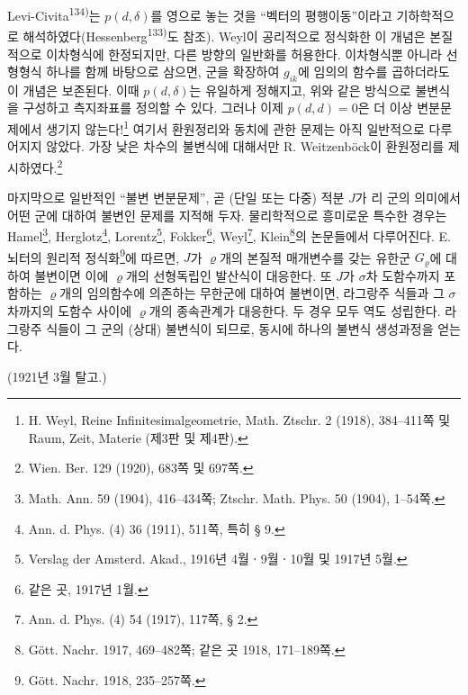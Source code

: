 Levi-Civita\textsuperscript{134)}는 $p(d,\delta)$를 영으로 놓는 것을 ``벡터의 평행이동''이라고 기하학적으로 해석하였다(Hessenberg\textsuperscript{133)}도 참조). Weyl이 공리적으로 정식화한 이 개념은 본질적으로 이차형식에 한정되지만, 다른 방향의 일반화를 허용한다. 이차형식뿐 아니라 선형형식 하나를 함께 바탕으로 삼으면, 군을 확장하여 $g_{ik}$에 임의의 함수를 곱하더라도 이 개념은 보존된다. 이때 $p(d,\delta)$는 유일하게 정해지고, 위와 같은 방식으로 불변식을 구성하고 측지좌표를 정의할 수 있다. 그러나 이제 $p(d,d)=0$은 더 이상 변분문제에서 생기지 않는다!\footnote{H. Weyl, Reine Infinitesimalgeometrie, Math. Ztschr. 2 (1918), 384--411쪽 및 Raum, Zeit, Materie (제3판 및 제4판).} 여기서 환원정리와 동치에 관한 문제는 아직 일반적으로 다루어지지 않았다. 가장 낮은 차수의 불변식에 대해서만 R. Weitzenböck이 환원정리를 제시하였다.\footnote{Wien. Ber. 129 (1920), 683쪽 및 697쪽.}

마지막으로 일반적인 ``불변 변분문제'', 곧 (단일 또는 다중) 적분 $J$가 리 군의 의미에서 어떤 군에 대하여 불변인 문제를 지적해 두자. 물리학적으로 흥미로운 특수한 경우는 Hamel\footnote{Math. Ann. 59 (1904), 416--434쪽; Ztschr. Math. Phys. 50 (1904), 1--54쪽.}, Herglotz\footnote{Ann. d. Phys. (4) 36 (1911), 511쪽, 특히 § 9.}, Lorentz\footnote{Verslag der Amsterd. Akad., 1916년 4월ㆍ9월ㆍ10월 및 1917년 5월.}, Fokker\footnote{같은 곳, 1917년 1월.}, Weyl\footnote{Ann. d. Phys. (4) 54 (1917), 117쪽, § 2.}, Klein\footnote{Gött. Nachr. 1917, 469--482쪽; 같은 곳 1918, 171--189쪽.}의 논문들에서 다루어진다. E. 뇌터의 원리적 정식화\footnote{Gött. Nachr. 1918, 235--257쪽.}에 따르면, $J$가 $\varrho$개의 본질적 매개변수를 갖는 유한군 $G_\varrho$에 대하여 불변이면 이에 $\varrho$개의 선형독립인 발산식이 대응한다. 또 $J$가 $\sigma$차 도함수까지 포함하는 $\varrho$개의 임의함수에 의존하는 무한군에 대하여 불변이면, 라그랑주 식들과 그 $\sigma$차까지의 도함수 사이에 $\varrho$개의 종속관계가 대응한다. 두 경우 모두 역도 성립한다. 라그랑주 식들이 그 군의 (상대) 불변식이 되므로, 동시에 하나의 불변식 생성과정을 얻는다.

\begin{center}
(1921년 3월 탈고.)
\end{center}
\endgroup
